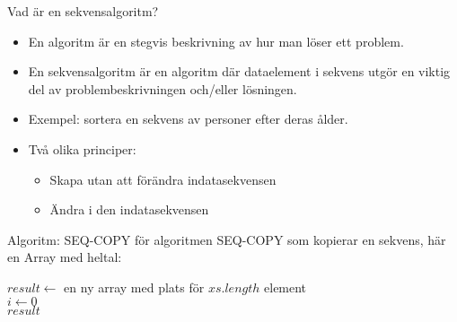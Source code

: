 


\begin{Slide}{Vad är en sekvensalgoritm?}
\begin{itemize} 
\item En algoritm är en stegvis beskrivning av hur man löser ett problem. 
\item En sekvensalgoritm är en algoritm där dataelement i sekvens utgör en viktig del av problembeskrivningen och/eller lösningen.   

\item Exempel: sortera en sekvens av personer efter deras ålder.

\item Två olika principer:
\begin{itemize} 
\item Skapa  utan att förändra indatasekvensen
\item Ändra   i den  indatasekvensen
\end{itemize}
\end{itemize}

\end{Slide}



\begin{Slide}{Algoritm: SEQ-COPY}
 för algoritmen SEQ-COPY som kopierar en sekvens, här en Array med heltal:\\
\noindent\hrulefill
\begin{algorithm}[H]
 $result \leftarrow$ en ny array med plats för $xs.length$ element\\
 $i \leftarrow 0$  \\
 \Return $result$
\end{algorithm}
\noindent\hrulefill
\end{Slide}

\ifkompendium\else

